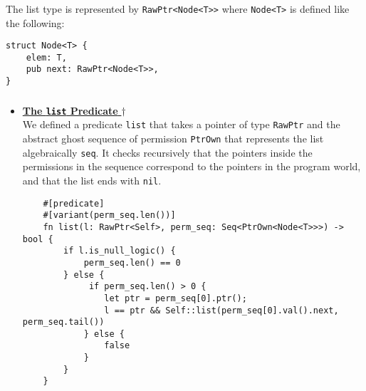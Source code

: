 \documentclass[11pt,a4paper]{article}
\begin{document}
\subsubsection{}
The list type is represented by \texttt{RawPtr<Node<T>>} where \texttt{Node<T>} is defined like the following:
\begin{verbatim}
struct Node<T> {
    elem: T,
    pub next: RawPtr<Node<T>>,
}
\end{verbatim}

\subsubsection{}
\begin{itemize}
    \item  \hyperlink{list}{\textbf{The \texttt{list} Predicate}
      $\dagger$}\\
        We defined a predicate \texttt{list} that takes a pointer of type \texttt{RawPtr} and the abstract ghost sequence of permission \texttt{PtrOwn} that represents the list algebraically \texttt{seq}. It checks recursively that the pointers inside the permissions in the sequence correspond to the pointers in the program world, and that the list ends with \texttt{nil}.\\
    \begin{verbatim}
    #[predicate]
    #[variant(perm_seq.len())]
    fn list(l: RawPtr<Self>, perm_seq: Seq<PtrOwn<Node<T>>>) -> bool {
        if l.is_null_logic() {
            perm_seq.len() == 0
        } else {
             if perm_seq.len() > 0 {
                let ptr = perm_seq[0].ptr();
                l == ptr && Self::list(perm_seq[0].val().next, perm_seq.tail())
            } else {
                false
            }
        }
    }
    \end{verbatim}
    
  \begin{figure}[tp]
    \centering
\end{figure}
\end{itemize}
\end{document}

